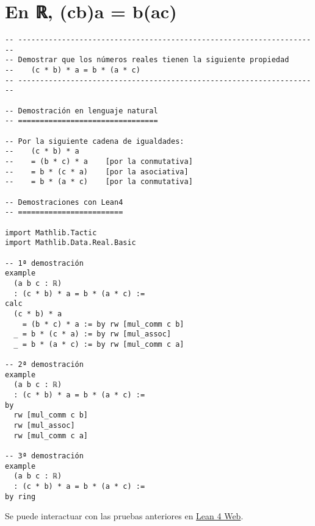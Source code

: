 \section{En ℝ, (cb)a = b(ac)}
\label{sec:orgd922ebb}
\begin{verbatim}
-- ---------------------------------------------------------------------
-- Demostrar que los números reales tienen la siguiente propiedad
--    (c * b) * a = b * (a * c)
-- ---------------------------------------------------------------------

-- Demostración en lenguaje natural
-- ================================

-- Por la siguiente cadena de igualdades:
--    (c * b) * a
--    = (b * c) * a    [por la conmutativa]
--    = b * (c * a)    [por la asociativa]
--    = b * (a * c)    [por la conmutativa]

-- Demostraciones con Lean4
-- ========================

import Mathlib.Tactic
import Mathlib.Data.Real.Basic

-- 1ª demostración
example
  (a b c : ℝ)
  : (c * b) * a = b * (a * c) :=
calc
  (c * b) * a
    = (b * c) * a := by rw [mul_comm c b]
  _ = b * (c * a) := by rw [mul_assoc]
  _ = b * (a * c) := by rw [mul_comm c a]

-- 2ª demostración
example
  (a b c : ℝ)
  : (c * b) * a = b * (a * c) :=
by
  rw [mul_comm c b]
  rw [mul_assoc]
  rw [mul_comm c a]

-- 3ª demostración
example
  (a b c : ℝ)
  : (c * b) * a = b * (a * c) :=
by ring
\end{verbatim}
Se puede interactuar con las pruebas anteriores en \href{https://lean.math.hhu.de/\#url=https://raw.githubusercontent.com/jaalonso/Calculemus2/main/src/(cb)a\_eq\_b(ac).lean}{Lean 4 Web}.


